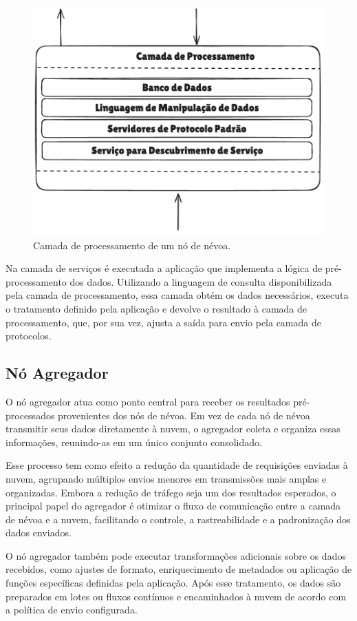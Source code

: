\begin{figure}[htb]
    \caption{\label{fig:camada_processamento}Camada de processamento de um nó de névoa.}
    \begin{center}
        \includegraphics[width=0.7\linewidth]{images/camada_processamento.png}
    \end{center}
\end{figure}

Na camada de serviços é executada a aplicação que implementa a lógica de pré-processamento dos dados. Utilizando a linguagem de consulta disponibilizada pela camada de processamento, essa camada obtém os dados necessários, executa o tratamento definido pela aplicação e devolve o resultado à camada de processamento, que, por sua vez, ajusta a saída para envio pela camada de protocolos.

\subsection{Nó Agregador}

O nó agregador atua como ponto central para receber os resultados pré-processados provenientes dos nós de névoa. Em vez de cada nó de névoa transmitir seus dados diretamente à nuvem, o agregador coleta e organiza essas informações, reunindo-as em um único conjunto consolidado.

Esse processo tem como efeito a redução da quantidade de requisições enviadas à nuvem, agrupando múltiplos envios menores em transmissões mais amplas e organizadas. Embora a redução de tráfego seja um dos resultados esperados, o principal papel do agregador é otimizar o fluxo de comunicação entre a camada de névoa e a nuvem, facilitando o controle, a rastreabilidade e a padronização dos dados enviados.

O nó agregador também pode executar transformações adicionais sobre os dados recebidos, como ajustes de formato, enriquecimento de metadados ou aplicação de funções específicas definidas pela aplicação. Após esse tratamento, os dados são preparados em lotes ou fluxos contínuos e encaminhados à nuvem de acordo com a política de envio configurada.

